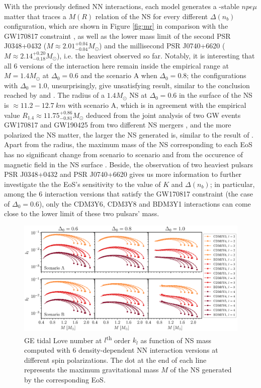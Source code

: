 With the previously defined \gls{NN} interactions, each model generates a \textbeta-stable $npe\mu$ matter that traces a $M(R)$ relation of the \gls{NS} for every different $\Delta(n_b)$ configuration, which are shown in Figure \ref{fig:mr} in comparison with the GW170817 constraint \citep{abbott2018gw170817}, as well as the lower mass limit of the second \gls{PSR} J0348+0432 ($M\approx 2.01^{+0.04}_{-0.04}M_\odot$) and the millisecond \gls{PSR} J0740+6620 ($M\approx 2.14^{+0.20}_{-0.18}M_\odot$), i.e. the heaviest  observed so far. Notably, it is interesting that all 6 versions of the interaction here remain inside the empirical range at $M=1.4M_\odot$ at $\Delta_0 = 0.6$ and the scenario A when $\Delta_0 = 0.8$; the configurations with $\Delta_0 = 1.0$, unsurprisingly, give unsatisfying result, similar to the conclusion reached by \cite{tan2020spin} and \cite{tews2020spin}. The radius of a $1.4M_\odot$ \gls{NS} at $\Delta_0 = 0.6$ in the surface of the \gls{NS} is $\approx 11.2 - 12.7\:km$ with scenario A, which is in agreement with the empirical value $R_{1.4} \approx 11.75^{+0.86}_{-0.81}M_\odot$ deduced from the joint analysis of two \gls{GW} events GW170817 and GW190425 from two different \gls{NS} mergers \citep{dietrich2020multimessenger}, and the more polarized the \gls{NS} matter, the larger the \gls{NS} generated is, similar to the result of \cite{tan2020spin}. Apart from the radius, the maximum mass of the \gls{NS} corresponding to each \gls{EoS} has no significant change from scenario to scenario and from the occurence of magnetic field in the \gls{NS} surface \citep{tan2021equation}. Beside, the observation of two heaviest pulsars \gls{PSR} J0348+0432 and \gls{PSR} J0740+6620 gives us more information to further investigate the the \gls{EoS}'s sensitivity to the value of $K$ and $\Delta(n_b)$; in particular, among the 6 interaction versions that satisfy the GW170817 constraint (the case of $\Delta_0 = 0.6$), only the CDM3Y6, CDM3Y8 and BDM3Y1 interactions can come close to the lower limit of these two pulsars' mass.\par
\begin{figure}[ht!]
        \centering
        \includegraphics[width=\textwidth]{fig/kl.eps}
        \caption{\gls{GE} tidal Love number at $l$\textsuperscript{th} order $k_l$ as function of \gls{NS} mass computed with 6 density-dependent \gls{NN} interaction versions at different spin polarizations. The dot at the end of each line represents the maximum gravitational mass $M$ of the \gls{NS} generated by the corresponding \gls{EoS}.}
        \label{fig:kl}
\end{figure} 
